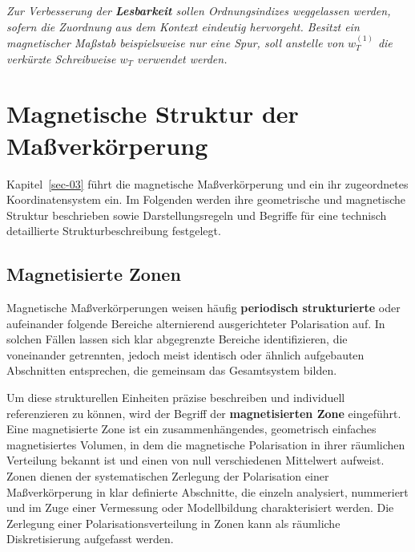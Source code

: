 \documentclass[
  ngerman,
  a4paper,
  twoside]{scrbook}
\newcounter{quartocallouttipno}
\newcommand{\quartocallouttip}[1]{\refstepcounter{quartocallouttipno}\label{#1}}
\begin{document}
\begin{tcolorbox}[enhanced jigsaw, arc=.35mm, bottomrule=.15mm, bottomtitle=1mm, breakable, colback=white, colbacktitle=quarto-callout-tip-color!10!white, colframe=quarto-callout-tip-color-frame, coltitle=black, left=2mm, leftrule=.75mm, opacityback=0, opacitybacktitle=0.6, rightrule=.15mm, title=\textcolor{quarto-callout-tip-color}{\faLightbulb}\hspace{0.5em}{Hinweis \ref*{tip-03-lesbarkeit}}, titlerule=0mm, toprule=.15mm, toptitle=1mm]

\quartocallouttip{tip-03-lesbarkeit} 

\emph{Zur Verbesserung der \textbf{Lesbarkeit} sollen Ordnungsindizes
weggelassen werden, sofern die Zuordnung aus dem Kontext eindeutig
hervorgeht. Besitzt ein magnetischer Maßstab beispielsweise nur eine
Spur, soll anstelle von \(w_T^{(1)}\) die verkürzte Schreibweise \(w_T\)
verwendet werden.}

\end{tcolorbox}


\chapter{Magnetische Struktur der Maßverkörperung}\label{sec-04}

Kapitel~\ref{sec-03} führt die magnetische Maßverkörperung und ein ihr
zugeordnetes Koordinatensystem ein. Im Folgenden werden ihre
geometrische und magnetische Struktur beschrieben sowie
Darstellungsregeln und Begriffe für eine technisch detaillierte
Strukturbeschreibung festgelegt.

\section{Magnetisierte Zonen}\label{sec-04-magnetisierte_zonen}

Magnetische Maßverkörperungen weisen häufig \textbf{periodisch
strukturierte} oder aufeinander folgende Bereiche alternierend
ausgerichteter Polarisation auf. In solchen Fällen lassen sich klar
abgegrenzte Bereiche identifizieren, die voneinander getrennten, jedoch
meist identisch oder ähnlich aufgebauten Abschnitten entsprechen, die
gemeinsam das Gesamtsystem bilden.

Um diese strukturellen Einheiten präzise beschreiben und individuell
referenzieren zu können, wird der Begriff der \textbf{magnetisierten
Zone} eingeführt. Eine magnetisierte Zone ist ein zusammenhängendes,
geometrisch einfaches magnetisiertes Volumen, in dem die magnetische
Polarisation in ihrer räumlichen Verteilung bekannt ist und einen von
null verschiedenen Mittelwert aufweist. Zonen dienen der systematischen
Zerlegung der Polarisation einer Maßverkörperung in klar definierte
Abschnitte, die einzeln analysiert, nummeriert und im Zuge einer
Vermessung oder Modellbildung charakterisiert werden. Die Zerlegung
einer Polarisationsverteilung in Zonen kann als räumliche
Diskretisierung aufgefasst werden.
\end{document}
